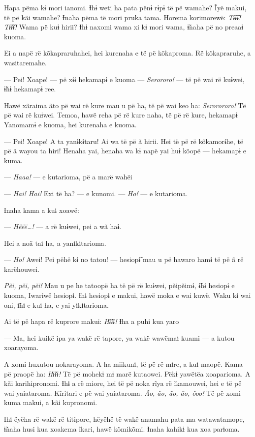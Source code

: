 Hapa pëma kɨ mori ianomi. Ɨhɨ weti ha pata pënɨ rɨpɨ të pë wamahe? Ĩyë
makui, të pë kãi wamahe? Ɨnaha pëma të mori pruka tama. Horema
korimorewë: \textit{Tɨ̃ɨ̃ɨ̃! Tɨ̃ɨ̃ɨ̃!} Wama pë kuɨ hirii? Ɨhɨ naxomi wama xi kɨ mori
wama, ɨ̃naha pë no preaaɨ kuoma. 

Ei a napë rë kõkapraruhahei, hei kurenaha e të pë kõkaproma. Rë
kõkapraruhe, a wasitaremahe. 

--- Pei! Xoape! --- pë xɨɨ hekamapɨ e kuoma --- \textit{Serororo!} --- të pë wai
rë kuɨwei, ɨ̃hɨ hekamapɨ ree. 

Hawë xãraima ãto pë wai rë kure mau u pë ha, të pë wai keo ha:
\textit{Serorororo!} Të pë wai rë kuɨwei. Temoa, hawë reha pë rë kure naha, të pë
rë kure, hekamapɨ Yanomamɨ e kuoma, hei kurenaha e kuoma. 

--- Pei! Xoape! A ta yanɨkɨtaru! Ai wa të pë ã hirii. Hei të pë rë
kõkamorɨhe, të pë ã wayou ta hiri! Henaha yai, henaha wa kɨ napë yai huɨ
kõopë --- hekamapɨ e kuma. 

--- \textit{Haaa!} --- e kutarioma, pë a marë wahëi 

--- \textit{Hai! Hai!} Exi të ha? --- e kunomi. --- \textit{Ho!} --- e kutarioma. 

Ɨnaha kama a kuɨ xoawë:

--- \textit{Hëëë\ldots{}!} --- a rë kuɨwei, pei a wã haɨ. 

Hei a noã taɨ ha, a yanɨkɨtarioma. 

--- \textit{Ho!} Awei! Pei pëhë kɨ no tatou! --- hesiopɨ̃ mau u pë hawaro hamɨ të
pë ã rë karëhouwei. 

\textit{Pẽi, pẽi, pẽi!} Mau u pe he tatoopë ha të pë rë kuɨwei, pẽipẽimɨ, ɨ̃hɨ
 hesiopɨ e kuoma, Iwariwë hesiopɨ. Ɨhɨ hesiopɨ e makui, hawë moka e wai
 kuwë. Waku kɨ wai oni, ɨ̃hɨ e kuɨ ha, e yai yɨkɨtarioma. 

Ai të pë hapa rë kuprore makui: \textit{Hɨ̃ɨɨ!} Ɨha a puhi kua yaro 

--- Ma, hei kuikë ipa ya wakë rë tapore, ya wakë wawëmaɨ kuami --- a
kutou xoarayoma. 

A xomi huxutou nokarayoma. A ha miikunɨ, të pë rë mɨre, a kuɨ maopë.
Kama pë praopë ha: \textit{Hɨ̃ɨɨ! }Të pë mohekɨ mɨ marë kutaowei. Pëkɨ yawëtëa
xoaparioma. A kãi karihipronomi. Ɨhɨ a rë miore, hei të pë noka rĩya rë
ĩkamouwei, hei e të pë wai yaiataroma. Kĩritari e pë wai yaiataroma. \textit{Ão,
ão, ão, ão, õoo!} Të pë xomi kuma makui, a kãi kupronomi. 

Ɨhɨ ëyëha rë wakë rë titipore, hëyëhë të wakë anamahu pata ma
watawatamope, ɨ̃naha husi kua xoakema ĩkari, hawë kõmikõmi. Ɨnaha kahikɨ
kua xoa parɨoma. 

